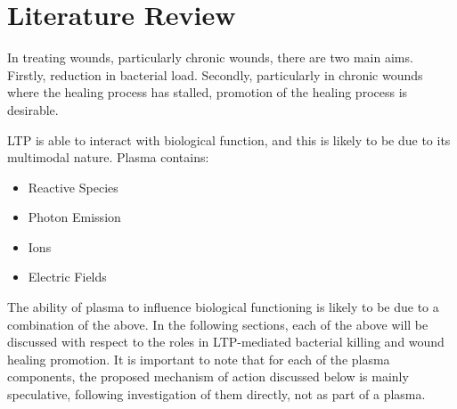 \documentclass[11pt, oneside]{article}   	%
\begin{document}
\section{Literature Review}
In treating wounds, particularly chronic wounds, there are two main aims.
Firstly, reduction in bacterial load. Secondly, particularly in chronic wounds where the healing process has stalled, promotion of the healing process is desirable.

LTP is able to interact with biological function, and this is likely to be due to its multimodal nature.
Plasma contains:
\begin{itemize}
\item Reactive Species
\item Photon Emission
\item Ions
\item Electric Fields
\end{itemize}
The ability of plasma to influence biological functioning is likely to be due to a combination of the above.
In the following sections, each of the above will be discussed with respect to the roles in LTP-mediated bacterial killing and wound healing promotion.
It is important to note that for each of the plasma components, the proposed mechanism of action discussed below is mainly speculative, following investigation of them directly, not as part of a plasma.
\end{document}
